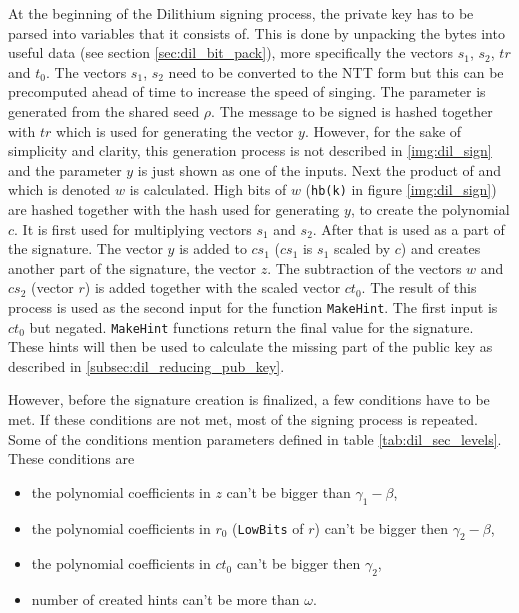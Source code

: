 At the beginning of the Dilithium signing process, the private key has to be parsed into variables that it consists of. This is done by unpacking the bytes into useful data (see section \ref{sec:dil_bit_pack}), more specifically the vectors $s_1$, $s_2$, $tr$ and $t_0$. The vectors $s_1$, $s_2$ need to be converted to the NTT form but this can be precomputed ahead of time to increase the speed of singing. The parameter  is generated from the shared seed $\rho$. The message to be signed is hashed together with $tr$ which is used for generating the vector $y$. However, for the sake of simplicity and clarity, this generation process is not described in \ref{img:dil_sign} and the parameter $y$ is just shown as one of the inputs. Next the product of  and  which is denoted $w$ is calculated. High bits of $w$ (\texttt{hb(k)} in figure \ref{img:dil_sign}) are hashed together with the hash used for generating $y$, to create the polynomial $c$. It is first used for multiplying vectors $s_1$ and $s_2$. After that is used as a part of the signature. The vector $y$ is added to $cs_1$ ($cs_1$ is $s_1$ scaled by $c$) and creates another part of the signature, the vector $z$. The subtraction of the vectors $w$ and $cs_2$ (vector $r$) is added together with the scaled vector $ct_0$. The result of this process is used as the second input for the function \texttt{MakeHint}. The first input is $ct_0$ but negated. \texttt{MakeHint} functions return the final value for the signature. These hints will then be used to calculate the missing part of the public key as described in \ref{subsec:dil_reducing_pub_key}.

However, before the signature creation is finalized, a few conditions have to be met. If these conditions are not met, most of the signing process is repeated. Some of the conditions mention parameters defined in table \ref{tab:dil_sec_levels}. These conditions are
\begin{itemize}
  \item the polynomial coefficients in $z$ can't be bigger than $\gamma_1-\beta$,
  \item the polynomial coefficients in $r_0$ (\texttt{LowBits} of $r$) can't be bigger then $\gamma_2-\beta$,
  \item the polynomial coefficients in $ct_0$ can't be bigger then $\gamma_2$,
  \item number of created hints can't be more than $\omega$.
\end{itemize}
